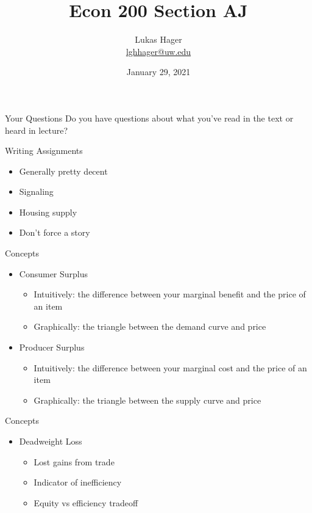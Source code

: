 \documentclass{beamer}
\title{Econ 200 Section AJ}
\author{Lukas Hager \\ \href{mailto:lghhager@uw.edu}{lghhager@uw.edu}}
\institute{Office Hours: Monday 8-9, Thursday 3:30-4:30}
\date{January 29, 2021}
\begin{document}
\begin{frame}
  \titlepage
\end{frame}


\begin{frame}{Your Questions}
    Do you have questions about what you've read in the text or heard in lecture?
\end{frame}

\begin{frame}{Writing Assignments}
    \begin{itemize}
        \item Generally pretty decent
        \item Signaling
        \item Housing supply
        \item Don't force a story
    \end{itemize}
\end{frame}

\begin{frame}{Concepts}
    \begin{itemize}
        \item Consumer Surplus
            \begin{itemize}
                \item Intuitively: the difference between your marginal benefit and the price of an item
                \item Graphically: the triangle between the demand curve and price
            \end{itemize}
        \item Producer Surplus
            \begin{itemize}
                \item Intuitively: the difference between your marginal cost and the price of an item
                \item Graphically: the triangle between the supply curve and price
            \end{itemize}
    \end{itemize}
\end{frame}

\begin{frame}{Concepts}
    \begin{itemize}
        \item Deadweight Loss
        \begin{itemize}
            \item Lost gains from trade
            \item Indicator of inefficiency
            \item Equity vs efficiency tradeoff
        \end{itemize}
    \end{itemize}
\end{frame}
\end{document}
